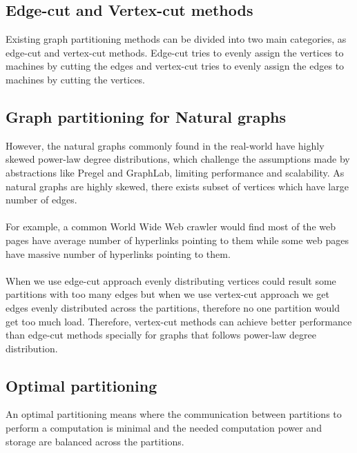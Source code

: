 \documentclass[12pt]{report}
\numberwithin{figure}{section}
\numberwithin{table}{section}
\begin{document}
\subsection{Edge-cut and Vertex-cut methods}
Existing graph partitioning methods can be divided into two main categories, as edge-cut and vertex-cut methods. Edge-cut tries to evenly assign the vertices to machines by cutting the edges and vertex-cut tries to evenly assign the edges to machines by cutting the vertices.
 
\subsection{Graph partitioning for Natural graphs}
However, the natural graphs commonly found in the real-world have highly skewed power-law degree distributions, which challenge the assumptions made by abstractions like  Pregel and GraphLab, limiting performance and scalability. As natural graphs are highly skewed, there exists subset of vertices which have large number of edges. 

\paragraph{}

For example, a common World Wide Web crawler would find most of the web pages have average number of hyperlinks pointing to them while some web pages have massive number of hyperlinks pointing to them. 

\paragraph{}

When we use edge-cut approach evenly distributing vertices could result some partitions with too many edges but when we use vertex-cut approach we get edges evenly distributed across the partitions, therefore no one partition would get too much load. Therefore, vertex-cut methods can achieve better performance than edge-cut methods\cite{PowerGraph} specially for graphs that follows power-law degree distribution.

\subsection{Optimal partitioning}
	An optimal partitioning means where the communication between partitions to perform a computation is minimal and the needed computation power and storage are balanced across the partitions.
\end{document}

